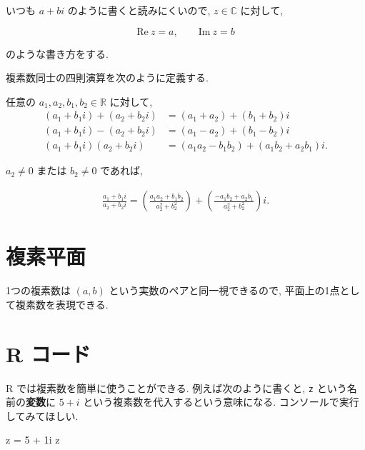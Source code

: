\documentclass[a4paper]{scrbook}
\newenvironment{Shaded}{\begin{snugshade}}{\end{snugshade}}
\newcommand{\DecValTok}[1]{\textcolor[rgb]{0.00,0.00,0.81}{{#1}}}
\newcommand{\StringTok}[1]{\textcolor[rgb]{0.31,0.60,0.02}{{#1}}}
\newcommand{\NormalTok}[1]{{#1}}
\theoremstyle{definition}
\let\BeginKnitrBlock\begin \let\EndKnitrBlock\end
\begin{document}
いつも \(a + bi\) のように書くと読みにくいので, \(z \in \mathbb C\)
に対して,

\begin{equation*}
   \mathrm{Re}~z = a, \qquad \mathrm{Im}~z = b
\end{equation*}

のような書き方をする.

複素数同士の四則演算を次のように定義する.

\BeginKnitrBlock{definition}
\protect\hypertarget{def:unnamed-chunk-16}{}{\label{def:unnamed-chunk-16}}
任意の \(a_1, a_2, b_1, b_2 \in \mathbb R\) に対して, \[
\begin{aligned}
  (a_1 + b_1 i) + (a_2 + b_2 i) &= (a_1 + a_2) + (b_1 + b_2) i \\
  (a_1 + b_1 i) - (a_2 + b_2 i) &= (a_1 - a_2) + (b_1 - b_2) i \\
  (a_1 + b_1 i) (a_2 + b_2 i) &= 
            (a_1 a_2 - b_1 b_2) + (a_1 b_2 + a_2 b_1 ) i.
\end{aligned}
\]

\(a_2 \neq 0\) または \(b_2 \neq 0\) であれば,

\[
\begin{aligned}
  \frac{a_1 + b_1 i}{a_2 + b_2 i}
    = 
    \left( \frac{a_1 a_2 + b_1 b_2}{a_2^2 + b_2^2} \right)
    +
    \left( \frac{- a_1 b_2 + a_2 b_1}{a_2^2 + b_2^2} \right) i.
\end{aligned}
\]
\EndKnitrBlock{definition}

\section{複素平面}

1つの複素数は \((a, b)\) という実数のペアと同一視できるので,
平面上の1点として複素数を表現できる.

\section{R コード}\label{r-}

R では複素数を簡単に使うことができる. 例えば次のように書くと, \texttt{z}
という名前の\textbf{変数}に \(5 + i\)
という複素数を代入するという意味になる. コンソールで実行してみてほしい.

\begin{Shaded}
\begin{Highlighting}[]
\NormalTok{z =}\StringTok{ }\DecValTok{5} \NormalTok{+}\StringTok{ }\NormalTok{1i}
\NormalTok{z}
\end{Highlighting}
\end{Shaded}
\end{document}
